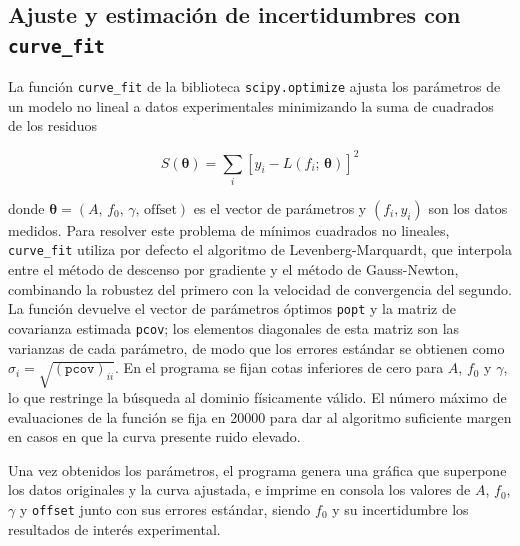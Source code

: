 \subsection{Ajuste y estimación de incertidumbres con \texttt{curve\_fit}}

La función \texttt{curve\_fit} de la biblioteca \texttt{scipy.optimize} ajusta los parámetros de un modelo no lineal a datos experimentales minimizando la suma de cuadrados de los residuos

\begin{equation}
    S(\boldsymbol{\theta}) = \sum_{i} \left[ y_i - L(f_i;\, \boldsymbol{\theta}) \right]^2
\end{equation}

donde $\boldsymbol{\theta} = (A,\, f_0,\, \gamma,\, \text{offset})$ es el vector de parámetros y $(f_i, y_i)$ son los datos medidos. Para resolver este problema de mínimos cuadrados no lineales, \texttt{curve\_fit} utiliza por defecto el algoritmo de Levenberg-Marquardt, que interpola entre el método de descenso por gradiente y el método de Gauss-Newton, combinando la robustez del primero con la velocidad de convergencia del segundo. La función devuelve el vector de parámetros óptimos \texttt{popt} y la matriz de covarianza estimada \texttt{pcov}; los elementos diagonales de esta matriz son las varianzas de cada parámetro, de modo que los errores estándar se obtienen como $\sigma_i = \sqrt{(\texttt{pcov})_{ii}}$. En el programa se fijan cotas inferiores de cero para $A$, $f_0$ y $\gamma$, lo que restringe la búsqueda al dominio físicamente válido. El número máximo de evaluaciones de la función se fija en 20000 para dar al algoritmo suficiente margen en casos en que la curva presente ruido elevado.

Una vez obtenidos los parámetros, el programa genera una gráfica que superpone los datos originales y la curva ajustada, e imprime en consola los valores de $A$, $f_0$, $\gamma$ y \texttt{offset} junto con sus errores estándar, siendo $f_0$ y su incertidumbre los resultados de interés experimental.

